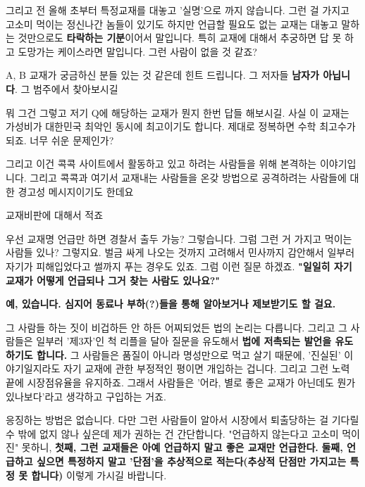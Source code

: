 그리고 전 올해 초부터 특정교재를 대놓고 '실명'으로 까지 않습니다. 그런 걸 가지고 고소미 먹이는 정신나간 놈들이 있기도 하지만
언급할 필요도 없는 교재는 대놓고 말하는 것만으로도 \textbf{타락하는 기분}이어서 말입니다.
특히 교재에 대해서 추궁하면 답 못 하고 도망가는 케이스라면 말입니다. 그런 사람이 없을 것 같죠?
\vspace{5mm}

A, B 교재가 궁금하신 분들 있는 것 같은데 힌트 드립니다.
그 저자들 \textbf{남자가  아닙니다}. 그 범주에서 찾아보시길
\vspace{5mm}

뭐 그건 그렇고 저기 Q에 해당하는 교재가 뭔지 한번 답들 해보시길.
사실 이 교재는 가성비가 대한민국 최악인 동시에 최고이기도 합니다. 제대로 정복하면 수학 최고수가 되죠.
너무 쉬운 문제인가?
\vspace{5mm}

그리고 이건 콕콕 사이트에서 활동하고 있고 하려는 사람들을 위해 본격하는 이야기입니다.
그리고 콕콕과 여기서 교재내는 사람들을 온갖 방법으로 공격하려는 사람들에 대한 경고성 메시지이기도 한데요
\vspace{5mm}

교재비판에 대해서 적죠
\vspace{5mm}

우선 교재명 언급만 하면 경찰서 출두 가능? 그렇습니다.
그럼 그런 거 가지고 먹이는 사람들 있나? 그렇지요.
벌금 싸게 나오는 것까지 고려해서 민사까지 감안해서 일부러 자기가 피해입었다고 썰까지 푸는 경우도 있죠.
그럼 이런 질문 하겠죠. \textbf{"일일히 자기 교재가 어떻게 언급되나 그거 찾는 사람도 있나요?"}
\vspace{5mm}

\textbf{예, 있습니다. 심지어 동료나 부하(?)들을 통해 알아보거나 제보받기도 할 걸요.}
\vspace{5mm}

그 사람들 하는 짓이 비겁하든 안 하든 어찌되었든 법의 논리는 다릅니다.
그리고 그 사람들은 일부러 '제3자'인 척 리플을 달아 질문을 유도해서 \textbf{법에 저촉되는 발언을 유도하기도 합니다.}
그 사람들은 품질이 아니라 명성만으로 먹고 살기 때문에, '진실된' 이야기일지라도 자기 교재에 관한 부정적인 평이면 개입하는 겁니다.
그리고 그런 노력 끝에 시장점유율을 유지하죠. 그래서 사람들은 '어라, 별로 좋은 교재가 아닌데도 뭔가 있나보다'라고 생각하고 구입하는 거죠.
\vspace{5mm}

응징하는 방법은 없습니다. 다만 그런 사람들이 알아서 시장에서 퇴출당하는 걸 기다릴 수 밖에 없지 않나 싶은데
제가 권하는 건 간단합니다. "언급하지 않는다고 고소미 먹이진" 못하니,
\textbf{첫째, 그런 교재들은 아예 언급하지 말고 좋은 교재만 언급한다.}
\textbf{둘째, 언급하고 싶으면 특정하지 말고 '단점'을 추상적으로 적는다(추상적 단점만 가지고는 특정 못 합니다)}
이렇게 가시길 바랍니다.
\vspace{5mm}

